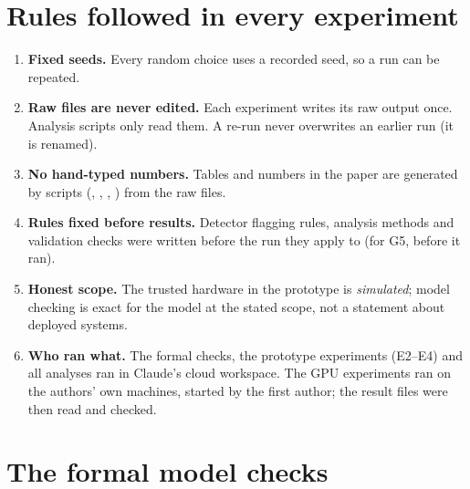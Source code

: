 \section{Rules followed in every experiment}
\begin{enumerate}
\item \textbf{Fixed seeds.} Every random choice uses a recorded seed, so a run can be repeated.
\item \textbf{Raw files are never edited.} Each experiment writes its raw output once. Analysis
  scripts only read them. A re-run never overwrites an earlier run (it is renamed).
\item \textbf{No hand-typed numbers.} Tables and numbers in the paper are generated by scripts
  (, , ,
  ) from the raw files.
\item \textbf{Rules fixed before results.} Detector flagging rules, analysis methods and
  validation checks were written before the run they apply to (for G5, before it ran).
\item \textbf{Honest scope.} The trusted hardware in the prototype is \emph{simulated}; model
  checking is exact for the model at the stated scope, not a statement about deployed systems.
\item \textbf{Who ran what.} The formal checks, the prototype experiments (E2--E4) and all
  analyses ran in Claude's cloud workspace. The GPU experiments ran on the authors' own
  machines, started by the first author; the result files were then read and checked.
\end{enumerate}

\section{The formal model checks}
